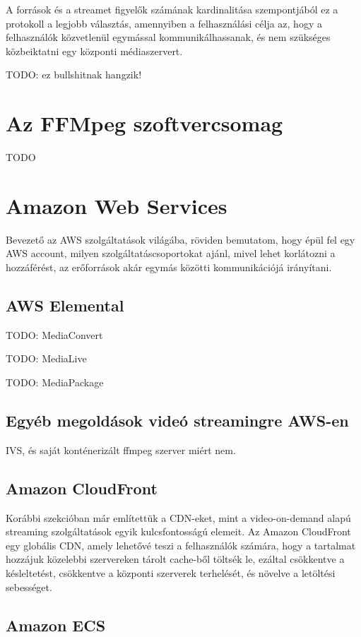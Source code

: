 A források és a streamet figyelők számának kardinalitása szempontjából ez a protokoll a legjobb választás, amennyiben a felhasználási célja az, hogy a felhasználók közvetlenül egymással kommunikálhassanak, és nem szükséges közbeiktatni egy központi médiaszervert. 

TODO: ez bullshitnak hangzik!

\section{Az FFMpeg szoftvercsomag}

TODO

\section{Amazon Web Services}

Bevezető az AWS szolgáltatások világába, röviden bemutatom, hogy épül fel egy AWS account, milyen szolgáltatáscsoportokat ajánl, mivel lehet korlátozni a hozzáférést, az erőforrások akár egymás közötti kommunikációjá irányítani.

\subsection{AWS Elemental}

TODO: MediaConvert

TODO: MediaLive

TODO: MediaPackage

\subsection{Egyéb megoldások videó streamingre AWS-en}

IVS, és saját konténerizált ffmpeg szerver miért nem.

\subsection{Amazon CloudFront}

Korábbi szekcióban már említettük a CDN-eket, mint a video-on-demand alapú streaming szolgáltatások egyik kulcsfontosságú elemeit. Az Amazon CloudFront egy globális CDN, amely lehetővé teszi a felhasználók számára, hogy a tartalmat hozzájuk közelebbi szervereken tárolt cache-ből töltsék le, ezáltal csökkentve a késleltetést, csökkentve a központi szerverek terhelését, és növelve a letöltési sebességet.

\subsection{Amazon ECS}

